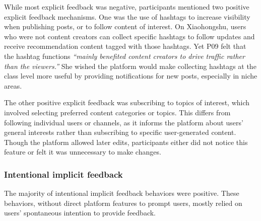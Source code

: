 While most explicit feedback was negative, participants mentioned two positive explicit feedback mechanisms. One was the use of hashtags to increase visibility when publishing posts, or to follow content of interest. On Xiaohongshu, users who were not content creators can collect specific hashtags to follow updates and receive recommendation content tagged with those hashtags. Yet P09 felt that the hashtag functions \textit{``mainly benefited content creators to drive traffic rather than the viewers.''} She wished the platform would make collecting hashtags at the class level more useful by providing notifications for new posts, especially in niche areas. 

The other positive explicit feedback was subscribing to topics of interest, which involved selecting preferred content categories or topics. This differs from following individual users or channels, as it informs the platform about users' general interests rather than subscribing to specific user-generated content. Though the platform allowed later edits, participants either did not notice this feature or felt it was unnecessary to make changes.

\subsubsection{Intentional implicit feedback} 
The majority of intentional implicit feedback behaviors were positive. These behaviors, without direct platform features to prompt users, mostly relied on users' spontaneous intention to provide feedback.

